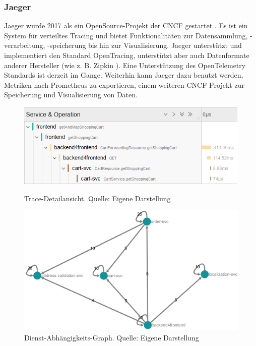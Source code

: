 \subsubsection{Jaeger}

Jaeger wurde 2017 als ein OpenSource-Projekt der CNCF gestartet \cite{Jaeger}. Es ist ein System für verteiltes Tracing und bietet Funktionalitäten zur Datensammlung, -verarbeitung, -speicherung bis hin zur Visualisierung. Jaeger unterstützt und implementiert den Standard OpenTracing, unterstützt aber auch Datenformate anderer Hersteller (wie z. B. Zipkin \cite{Zipkin}). Eine Unterstützung des OpenTelemetry Standards ist derzeit im Gange. Weiterhin kann Jaeger dazu benutzt werden, Metriken nach Prometheus \cite{Prometheus} zu exportieren, einem weiteren CNCF Projekt zur Speicherung und Visualisierung von Daten.

\begin{figure}
\centering
\includegraphics[width=\linewidth]{img/03_methoden/jaeger_trace-detail-view.png}
\caption{Trace-Detailansicht. Quelle: Eigene Darstellung}
\label{fig:jaeger-ui_trace-detail-view}
\smallskip\par
\includegraphics[width=\linewidth]{img/03_methoden/jaeger_dependency-graph.png}
\caption{Dienst-Abhängigkeits-Graph. Quelle: Eigene Darstellung}
\label{fig:jaeger-ui_dependency-graph}
\end{figure}

